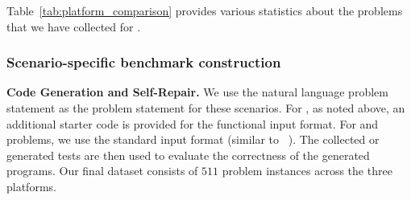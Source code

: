 \noindent Table~\ref*{tab:platform_comparison} provides various statistics about the problems that we have collected for \livecodebench{}. 



\subsubsection{Scenario-specific benchmark construction}
\label{subsec:scenario-specific}

\textbf{Code Generation and Self-Repair.}
We use the natural language problem statement as the problem statement for these scenarios. 
For \leetcode{}, as noted above, an additional starter code is provided for the functional input format.
For \atcoder{} and \codeforces{} problems, we use the standard input format (similar to ~\citep{hendrycks2021measuring}). 
The collected or generated tests are then used to evaluate the correctness of the generated programs.
Our final dataset consists of $511$ problem instances across the three platforms. 


